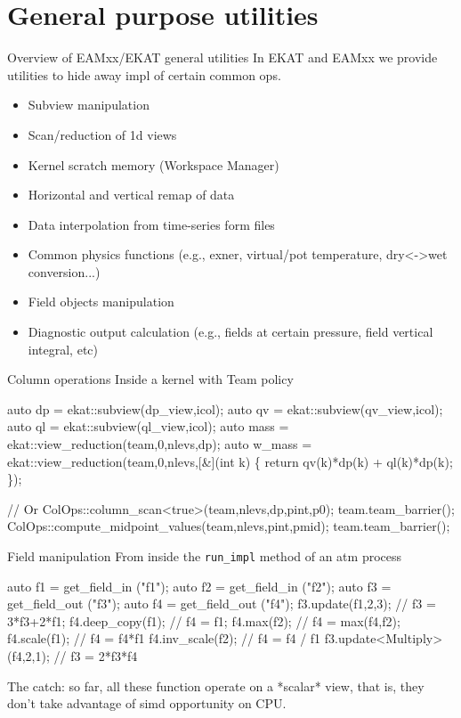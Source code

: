 \documentclass[8pt,NM,theme=angles,number=2023-00000]{sandia-beamer}
\begin{document}
\section{General purpose utilities}
\begin{frame}{Overview of EAMxx/EKAT general utilities}
  In EKAT and EAMxx we provide utilities to hide away impl of certain common ops.
  \begin{itemize}
    \item Subview manipulation
    \item Scan/reduction of 1d views
    \item Kernel scratch memory (Workspace Manager)
    \item Horizontal and vertical remap of data
    \item Data interpolation from time-series form files
    \item Common physics functions (e.g., exner, virtual/pot temperature, dry<->wet conversion...)
    \item Field objects manipulation
    \item Diagnostic output calculation (e.g., fields at certain pressure, field vertical integral, etc)
  \end{itemize}
\end{frame}

\begin{frame}[fragile]{Column operations}
  Inside a kernel with Team policy
  \begin{semiverbatim} \small
      auto dp = ekat::subview(dp_view,icol);
      auto qv = ekat::subview(qv_view,icol);
      auto ql = ekat::subview(ql_view,icol);
      auto mass = ekat::view_reduction(team,0,nlevs,dp);
      auto w_mass = ekat::view_reduction(team,0,nlevs,[&](int k) \{
        return qv(k)*dp(k) + ql(k)*dp(k);
      \});

      // Or
      ColOps::column_scan<true>(team,nlevs,dp,pint,p0);
      team.team_barrier();
      ColOps::compute_midpoint_values(team,nlevs,pint,pmid);
      team.team_barrier();
  \end{semiverbatim}
\end{frame}

\begin{frame}[fragile]{Field manipulation}
  From inside the \colorbox{lightlightgray}{\texttt{run\_impl}} method of an atm process
  \begin{semiverbatim} \small
    auto f1 = get_field_in ("f1");
    auto f2 = get_field_in ("f2");
    auto f3 = get_field_out ("f3");
    auto f4 = get_field_out ("f4");
    f3.update(f1,2,3); // f3 = 3*f3+2*f1;
    f4.deep_copy(f1);  // f4 = f1;
    f4.max(f2);        // f4 = max(f4,f2);
    f4.scale(f1);      // f4 = f4*f1
    f4.inv_scale(f2);  // f4 = f4 / f1
    f3.update<Multiply>(f4,2,1);  // f3 = 2*f3*f4
  \end{semiverbatim}

  \vspace{-0.5cm}
  The catch: so far, all these function operate on a *scalar* view, that is,
  they don't take advantage of simd opportunity on CPU.
\end{frame}
\end{document}
